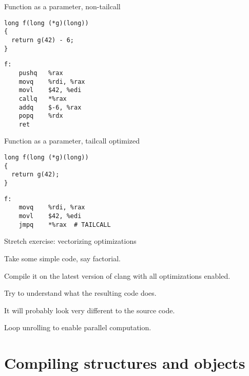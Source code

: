 \documentclass[landscape]{beamer}
\begin{document}
\begin{frame}[fragile]{Function as a parameter, non-tailcall }
\begin{minipage}{.5\textwidth}
\begin{verbatim}
long f(long (*g)(long))
{
  return g(42) - 6;
}
\end{verbatim}
\end{minipage}
%
\begin{minipage}{.4\textwidth}
\begin{verbatim}
f: 
	pushq	%rax
	movq	%rdi, %rax
	movl	$42, %edi
	callq	*%rax
	addq	$-6, %rax
	popq	%rdx
	ret
\end{verbatim}
\end{minipage}

\end{frame}


\begin{frame}[fragile]{Function as a parameter, tailcall optimized}
\begin{minipage}{.5\textwidth}
\begin{verbatim}
long f(long (*g)(long))
{
  return g(42);
}
\end{verbatim}
\end{minipage}
%
\begin{minipage}{.4\textwidth}
\begin{verbatim}
f:                              
	movq	%rdi, %rax
	movl	$42, %edi
	jmpq	*%rax  # TAILCALL
\end{verbatim}
\end{minipage}
\end{frame}


\begin{frame}{Stretch exercise: vectorizing optimizations}

Take some simple code, say factorial.

Compile it on the latest version of clang with all optimizations enabled.

Try to understand what the resulting code does.

It will probably look very different to the source code.

Loop unrolling to enable parallel computation.

\end{frame}

\section{Compiling structures and objects}
\end{document}
